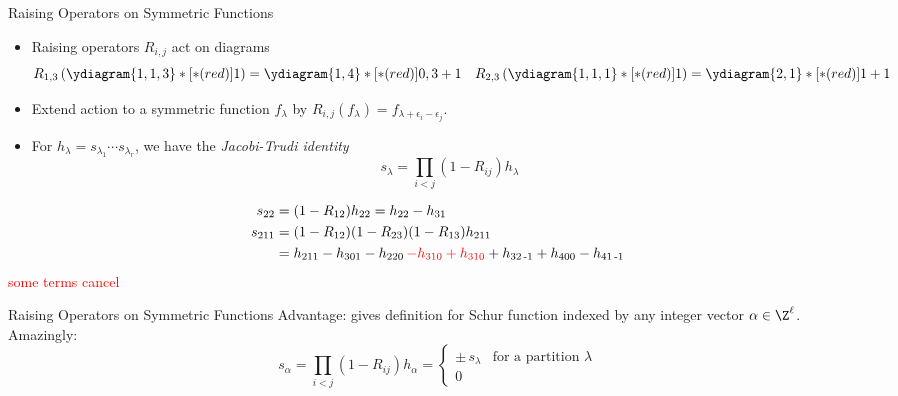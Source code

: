 \documentclass{beamer}
\begin{document}
\begin{frame}{Raising Operators on Symmetric Functions}
  \begin{itemize}
  \item Raising operators \(R_{i,j}\) act on diagrams \[
      R_{1,3} \left( \ydiagram{1,1,3}*[*(red)]{1} \right) =
      \ydiagram{1,4}*[*(red)]{0,3+1} \ \ \ R_{2,3} \left(
        \ydiagram{1,1,1}*[*(red)]{1} \right) =
      \ydiagram{2,1}*[*(red)]{1+1}
    \]
  \item Extend action to a symmetric function \(f_\lambda\) by
    \(R_{i,j}(f_\lambda) = f_{\lambda+\epsilon_i-\epsilon_j}\).
  \item For \(h_\lambda = s_{\lambda_1} \cdots s_{\lambda_r}\), we
    have the \emph{Jacobi-Trudi identity}\[
      s_\lambda = \prod_{i < j} (1-R_{ij}) h_\lambda
    \]
  \end{itemize}
  \begin{align*}
    s_{22} & = (1-R_{12}) h_{22} =  h_{22} - h_{31}\\
    s_{211}
    & = (1-R_{12})(1-R_{23})(1-R_{13}) h_{211}\\
    & = h_{211} - h_{301} - h_{220}\, \textcolor{red}{- h_{310}
      +  h_{310}} + h_{32\,\text{-}1}+h_{400} -  h_{41\,\text{-}1}
  \end{align*}
  \textcolor{red}{some terms cancel}
\end{frame}
\begin{frame}{Raising Operators on Symmetric Functions}
  Advantage: gives definition for Schur function indexed by any
  integer vector \(\alpha \in \Z^\ell\). Amazingly: \[
s_\alpha = \prod_{i<j} (1-R_{ij}) h_\alpha = 
\begin{cases} \pm\, s_\lambda & \text{for a partition $\lambda$} \\0\end{cases}
  \]
\end{frame}
\end{document}
